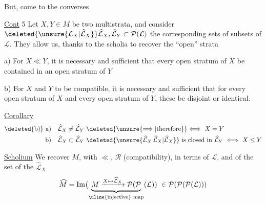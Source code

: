 But,  come to the converses


\uline{Cont} 5 Let $X,Y\in M$ be two multistrata, and consider $\deleted{\unsure{\mathcal{L}_X|\widehat{\mathcal{L}}_X}}\widehat{\mathcal{L}}_X,\widehat{\mathcal{L}}_Y\subset\mathcal P(\mathcal{L})$ the corresponding sets of subsets of $\mathcal{L}$. They allow us, thanks to the scholia to recover the ``open'' strata

a) For $X\ll Y$, it is necessary and sufficient that  every open stratum of $X$ be contained in an open stratum of $Y$


b) For $X$ and $Y$ to be compatible, it is necessary and sufficient that for every open stratum of $X$ and every open stratum of $Y$,  these be disjoint or identical.

\uline{Corollary}
\[
\begin{aligned}
\text{\deleted{b)} a)}\quad &\widehat{\mathcal{L}}_X\ne\widehat{\mathcal{L}}_Y\ \deleted{\unsure{\Longrightarrow|\text{therefore}}}\Longleftrightarrow\ X=Y\\
\text{b)}\quad &\widehat{\mathcal{L}}_X\subset\widehat{\mathcal{L}}_Y\ \deleted{\unsure{\widehat{\mathcal{L}}_X\,\widehat{\mathcal{L}}_X|\widehat{\mathcal{L}}_X}}\ \text{is closed in }\widehat{\mathcal{L}}_Y\ \Longleftrightarrow\ X\leq Y
\end{aligned}
\]

\uline{Scholium} We recover $M$, with $\ll$, $\mathcal R$ (compatibility), in terms of $\mathcal{L}$, and of the set  of the $\widehat{\mathcal{L}}_X$
\[
\widehat M=\operatorname{Im}\bigl(\underbrace{M\xrightarrow{X\mapsto\widehat{\mathcal{L}}_X}\mathcal P(\mathcal P}_{\text{\uline{injective} map}}(\mathcal{L}))\ \in\mathcal P(\mathcal P(\mathcal P(\mathcal{L})))
\]
